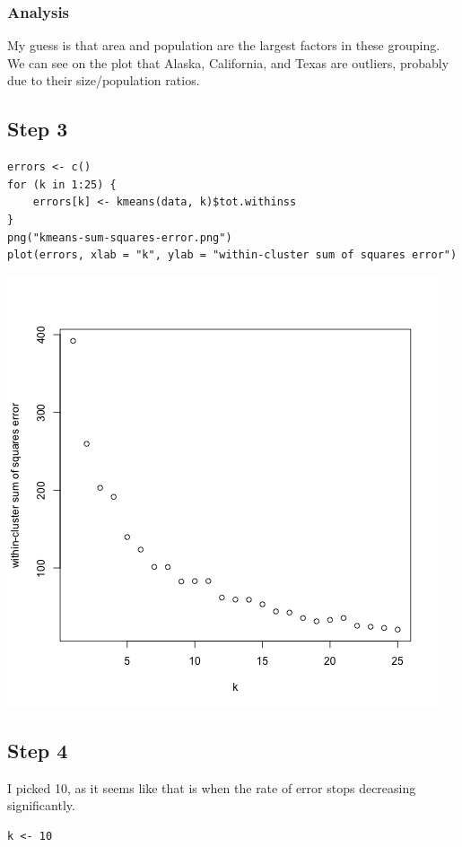\documentclass[11pt]{article}
\begin{document}
\subsubsection*{Analysis}
\label{sec:org7c96fa3}
My guess is that area and population are the largest factors in these grouping.
We can see on the plot that Alaska, California, and Texas are outliers, probably
due to their size/population ratios. 
\subsection*{Step 3}
\label{sec:orgf729d21}
\begin{verbatim}
errors <- c()
for (k in 1:25) {
    errors[k] <- kmeans(data, k)$tot.withinss
}
png("kmeans-sum-squares-error.png")
plot(errors, xlab = "k", ylab = "within-cluster sum of squares error")
\end{verbatim}

\begin{center}
\includegraphics[width=.9\linewidth]{kmeans-sum-squares-error.png}
\end{center}

\subsection*{Step 4}
\label{sec:org451160d}
I picked 10, as it seems like that is when the rate of error stops decreasing
significantly. 
\begin{verbatim}
k <- 10
\end{verbatim}
\end{document}
